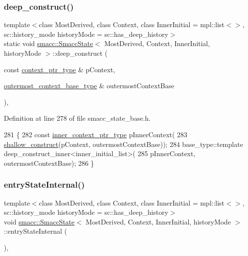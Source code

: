 \subsubsection{\texorpdfstring{deep\+\_\+construct()}{deep\_construct()}}
{\footnotesize\ttfamily template$<$class Most\+Derived, class Context, class Inner\+Initial = mpl\+::list$<$$>$, sc\+::history\+\_\+mode history\+Mode = sc\+::has\+\_\+deep\+\_\+history$>$ \\
static void \hyperlink{classsmacc_1_1SmaccState}{smacc\+::\+Smacc\+State}$<$ Most\+Derived, Context, Inner\+Initial, history\+Mode $>$\+::deep\+\_\+construct (\begin{DoxyParamCaption}\item[{const \hyperlink{classsmacc_1_1SmaccState_a0e15b77514301039f6bc093a9d3f6425}{context\+\_\+ptr\+\_\+type} \&}]{p\+Context,  }\item[{\hyperlink{classsmacc_1_1SmaccState_aaf76bbe2aa9dd73e3284605f84ab4b16}{outermost\+\_\+context\+\_\+base\+\_\+type} \&}]{outermost\+Context\+Base }\end{DoxyParamCaption})\hspace{0.3cm}{\ttfamily [inline]}, {\ttfamily [static]}}



Definition at line 278 of file smacc\+\_\+state\+\_\+base.\+h.


\begin{DoxyCode}
281     \{
282       \textcolor{keyword}{const} \hyperlink{classsmacc_1_1SmaccState_a65a772c2e2039e9a59148ba6ffb54d8a}{inner\_context\_ptr\_type} pInnerContext(
283           \hyperlink{classsmacc_1_1SmaccState_a1dccb401e1a99031863a21a590d953e6}{shallow\_construct}(pContext, outermostContextBase));
284       base\_type::template deep\_construct\_inner<inner\_initial\_list>(
285           pInnerContext, outermostContextBase);
286     \}
\end{DoxyCode}
\mbox{\label{classsmacc_1_1SmaccState_a084b95d0cb856d048fdb5ce81400eec7}} 
\subsubsection{\texorpdfstring{entry\+State\+Internal()}{entryStateInternal()}}
{\footnotesize\ttfamily template$<$class Most\+Derived, class Context, class Inner\+Initial = mpl\+::list$<$$>$, sc\+::history\+\_\+mode history\+Mode = sc\+::has\+\_\+deep\+\_\+history$>$ \\
void \hyperlink{classsmacc_1_1SmaccState}{smacc\+::\+Smacc\+State}$<$ Most\+Derived, Context, Inner\+Initial, history\+Mode $>$\+::entry\+State\+Internal (\begin{DoxyParamCaption}{ }\end{DoxyParamCaption})\hspace{0.3cm}{\ttfamily [inline]}, {\ttfamily [private]}}



